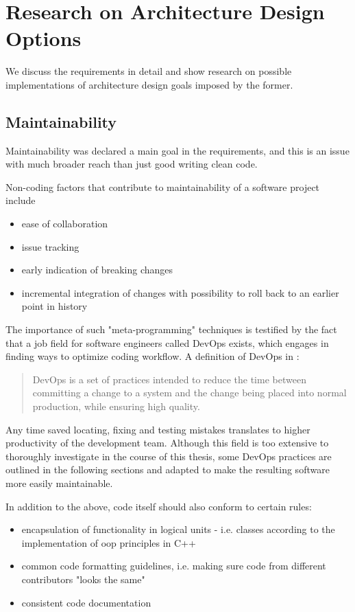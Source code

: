 \chapter{Research on Architecture Design Options}

We discuss the requirements in detail and show research on possible implementations of architecture design goals imposed by the former.

\section{Maintainability}
Maintainability was declared a main goal in the requirements, and this is an issue with much broader reach than just good writing clean code.

Non-coding factors that contribute to maintainability of a software project include
\begin{itemize}
	\item ease of collaboration
	\item issue tracking
	\item early indication of breaking changes
	\item incremental integration of changes with possibility to roll back to an earlier point in history
\end{itemize}

The importance of such "meta-programming" techniques is testified by the fact that a job field for software engineers called \gls{DevOps} exists, which engages in finding ways to optimize coding workflow.
A definition of DevOps in \citet{Bass2015}:
\begin{quote}
	DevOps is a set of practices intended to reduce the time between committing a change to a system and the change being placed into normal production, while ensuring high quality.
\end{quote}

Any time saved locating, fixing and testing mistakes translates to higher productivity of the development team. Although this field is too extensive to thoroughly investigate in the course of this thesis, some DevOps practices are outlined in the following sections and adapted to make the resulting software more easily maintainable.

In addition to the above, code itself should also conform to certain rules:
\begin{itemize}
	\item encapsulation of functionality in logical units - i.e. classes according to the implementation of \gls{oop} principles in C++
	\item common code formatting guidelines, i.e. making sure code from different contributors "looks the same"
	\item consistent code documentation
\end{itemize}

